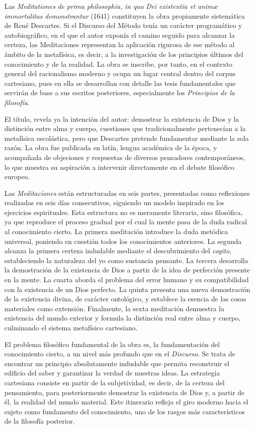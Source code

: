 \documentclass[10pt]{article}
\begin{document}
Las \textit{Meditationes de prima philosophia, in qua Dei existentia et animæ immortalitas demonstrantur} (1641) constituyen la obra propiamente sistemática de René Descartes.
Si el Discurso del Método tenía un carácter programático y autobiográfico, en el que el autor exponía el camino seguido para alcanzar la certeza, las Meditaciones representan la aplicación 
rigurosa de ese método al ámbito de la metafísica, es decir, a la investigación de los principios últimos del conocimiento y de la realidad. La obra se inscribe, por tanto, en el contexto general del racionalismo
moderno y ocupa un lugar central dentro del corpus cartesiano, pues en ella se desarrollan con detalle las tesis fundamentales que servirán de base a sus escritos posteriores, especialmente los 
\textit{Principios de la filosofía}.

El título, revela ya la intención del autor: demostrar la existencia de Dios y la distinción entre alma y cuerpo, cuestiones que tradicionalmente pertenecían a la metafísica escolástica, pero que 
Descartes pretende fundamentar mediante la sola razón. La obra fue publicada en latín, lengua académica de la época, y acompañada de objeciones y respuestas de diversos pensadores contemporáneos, 
lo que muestra su aspiración a intervenir directamente en el debate filosófico europeo.

Las \textit{Meditaciones} están estructuradas en seis partes, presentadas como reflexiones realizadas en seis días consecutivos, siguiendo un modelo inspirado en los ejercicios espirituales. Esta estructura
no es meramente literaria, sino filosófica, ya que reproduce el proceso gradual por el cual la mente pasa de la duda radical al conocimiento cierto. La primera meditación introduce la duda metódica universal,
poniendo en cuestión todos los conocimientos anteriores. La segunda alcanza la primera certeza indudable mediante el descubrimiento del \textit{cogito}, estableciendo la naturaleza del yo como sustancia 
pensante. La tercera desarrolla la demostración de la existencia de Dios a partir de la idea de perfección presente en la mente. La cuarta aborda el problema del error humano y su compatibilidad con la 
existencia de un Dios perfecto. La quinta presenta una nueva demostración de la existencia divina, de carácter ontológico, y establece la esencia de las cosas materiales como extensión. Finalmente, la 
sexta meditación demuestra la existencia del mundo exterior y formula la distinción real entre alma y cuerpo, culminando el sistema metafísico cartesiano.

El problema filosófico fundamental de la obra es, la fundamentación del conocimiento cierto, a un nivel más profundo que en el \textit{Discurso}. Se trata de encontrar un principio 
absolutamente indudable que permita reconstruir el edificio del saber y garantizar la verdad de nuestras ideas. La estrategia cartesiana consiste en partir de la subjetividad, es decir, de la certeza
del pensamiento, para posteriormente demostrar la existencia de Dios y, a partir de él, la realidad del mundo material. Este itinerario refleja el giro moderno hacia el sujeto como fundamento del 
conocimiento, uno de los rasgos más característicos de la filosofía posterior.
\end{document}
